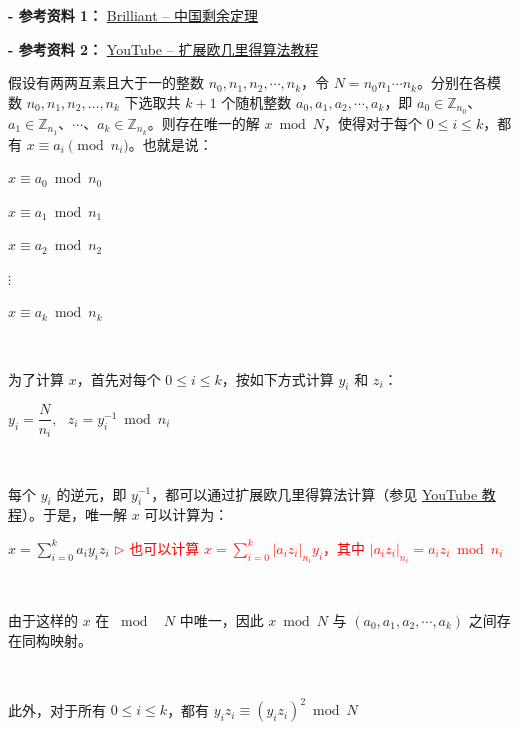 \textbf{- 参考资料 1：}
\href{https://brilliant.org/wiki/chinese-remainder-theorem/}{Brilliant -- 中国剩余定理}~\cite{crt}

\noindent \textbf{- 参考资料 2：}
\href{https://www.youtube.com/watch?v=fz1vxq5ts5I}{YouTube -- 扩展欧几里得算法教程}



\begin{tcolorbox}[title={\textbf{\tboxtheorem{\ref*{sec:chinese-remainder}.1} 中国剩余定理}}]

假设有两两互素且大于一的整数 $n_0, n_1, n_2, \cdots, n_k$，令 $N = n_0 n_1 \cdots n_k$。分别在各模数 $n_0, n_1, n_2, \dots, n_k$ 下选取共 $k + 1$ 个随机整数 $a_0, a_1, a_2, \cdots, a_k$，即 $a_0 \in \mathbb{Z}_{n_0}$、$a_1 \in \mathbb{Z}_{n_1}$、$\cdots$、$a_k \in \mathbb{Z}_{n_k}$。则存在唯一的解 $x \bmod N$，使得对于每个 $0 \le i \le k$，都有 $x \equiv a_i \pmod{n_i}$。也就是说：

\text{ } $x \equiv a_0 \bmod n_0$

\text{ } $x \equiv a_1 \bmod n_1$

\text{ } $x \equiv a_2 \bmod n_2$

\text{ } \text{ } $\vdots$

\text{ } $x \equiv a_k \bmod n_k$

$ $

为了计算 $x$，首先对每个 $0 \leq i \leq k$，按如下方式计算 $y_i$ 和 $z_i$：

$y_i = \dfrac{N}{n_i}, \text{ } z_i = y_i^{-1} \bmod n_i$

$ $

每个 $y_i$ 的逆元，即 $y_i^{-1}$，都可以通过扩展欧几里得算法计算（参见 \href{https://www.youtube.com/watch?v=fz1vxq5ts5I}{YouTube 教程}）。于是，唯一解 $x$ 可以计算为：

$x = \sum\limits_{i=0}^k a_i y_i z_i $ \textcolor{red}{ $\rhd$ 也可以计算 $ x = \sum\limits_{i=0}^k |a_i z_i|_{n_i} y_i$，其中 $|a_i z_i|_{n_i} = a_i z_i \bmod n_i$}

$ $

由于这样的 $x$ 在 $\bmod \text{ } N$ 中唯一，因此 $x \bmod N$ 与 $(a_0, a_1, a_2, \cdots, a_k)$ 之间存在同构映射。

$ $

此外，对于所有 $0 \leq i \leq k$，都有 $y_iz_i \equiv (y_iz_i)^2 \bmod N$ \text{ }
\end{tcolorbox}


